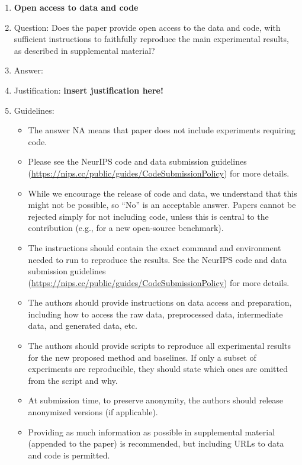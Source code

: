 \documentclass{article}
\begin{document}
\begin{enumerate}
\item {\bf Open access to data and code}
    \item[] Question: Does the paper provide open access to the data and code, with sufficient instructions to faithfully reproduce the main experimental results, as described in supplemental material?
    \item[] Answer: \answerYes{} %
    \item[] Justification: \textbf{insert justification here!}
    \item[] Guidelines:
    \begin{itemize}
        \item The answer NA means that paper does not include experiments requiring code.
        \item Please see the NeurIPS code and data submission guidelines (\url{https://nips.cc/public/guides/CodeSubmissionPolicy}) for more details.
        \item While we encourage the release of code and data, we understand that this might not be possible, so “No” is an acceptable answer. Papers cannot be rejected simply for not including code, unless this is central to the contribution (e.g., for a new open-source benchmark).
        \item The instructions should contain the exact command and environment needed to run to reproduce the results. See the NeurIPS code and data submission guidelines (\url{https://nips.cc/public/guides/CodeSubmissionPolicy}) for more details.
        \item The authors should provide instructions on data access and preparation, including how to access the raw data, preprocessed data, intermediate data, and generated data, etc.
        \item The authors should provide scripts to reproduce all experimental results for the new proposed method and baselines. If only a subset of experiments are reproducible, they should state which ones are omitted from the script and why.
        \item At submission time, to preserve anonymity, the authors should release anonymized versions (if applicable).
        \item Providing as much information as possible in supplemental material (appended to the paper) is recommended, but including URLs to data and code is permitted.
    \end{itemize}



\end{enumerate}
\end{document}
